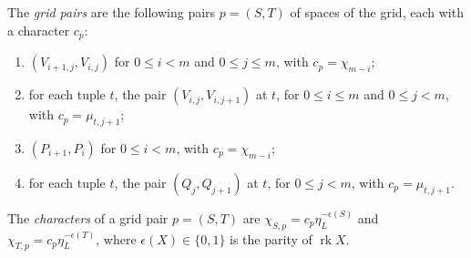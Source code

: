 \begin{definition}
The \emph{grid pairs} are the following pairs $p=(S,T)$ of spaces of the grid,
each with a character $c_p$:
\begin{enumerate}
\item[(G1)] $(V_{i+1,j},V_{i,j})$ for $0\leq i<m$ and $0\leq j\leq m$, with
  $c_p=\chi_{m-i}$;
\item[(G2)] for each tuple $t$, the pair $(V_{i,j},V_{i,j+1})$ at $t$, for
  $0\leq i\leq m$ and $0\leq j<m$, with $c_p=\mu_{t,j+1}$;
\item[(G3)] $(P_{i+1},P_i)$ for $0\leq i<m$, with $c_p=\chi_{m-i}$;
\item[(G4)] for each tuple $t$, the pair $(Q_j,Q_{j+1})$ at $t$, for
  $0\leq j<m$, with $c_p=\mu_{t,j+1}$.
\end{enumerate}
The \emph{characters} of a grid pair $p=(S,T)$ are
$\chi_{S,p}=c_p\eta_L^{-\epsilon(S)}$ and $\chi_{T,p}=c_p\eta_L^{-\epsilon(T)}$,
where $\epsilon(X)\in\{0,1\}$ is the parity of $\operatorname{rk}X$.


\end{definition}
